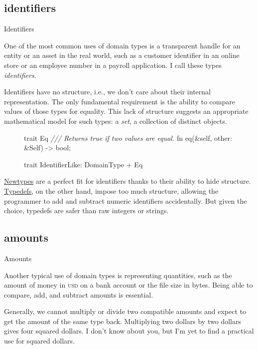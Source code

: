 \documentclass{article}
\begin{document}
\subsection{identifiers}{Identifiers}

One of the most common uses of domain types is a transparent handle for an entity or an asset in the real world, such as a customer identifier in an online store or an employee number in a payroll application.
I call these types \emph{identifiers}.

Identifiers have no structure, i.e., we don't care about their internal representation.
The only fundamental requirement is the ability to compare values of those types for equality.
This lack of structure suggests an appropriate mathematical model for such types: a \emph{set}, a collection of distinct objects.

\begin{figure}
\begin{code}
trait Eq {
  \emph{/// Returns true if two values are equal.}
  fn eq(&self, other: &Self) -> bool;
}

trait IdentifierLike: DomainType + Eq {}
\end{code}
\end{figure}

\href{#newtypes}{Newtypes} are a perfect fit for identifiers thanks to their ability to hide structure.
\href{#typdefs}{Typedefs}, on the other hand, impose too much structure, allowing the programmer to add and subtract numeric identifiers accidentally.
But given the choice, typedefs are safer than raw integers or strings.

\subsection{amounts}{Amounts}

Another typical use of domain types is representing quantities, such as the amount of money in \textsc{usd} on a bank account or the file size in bytes.
Being able to compare, add, and subtract amounts is essential.

Generally, we cannot multiply or divide two compatible amounts and expect to get the amount of the same type back.
Multiplying two dollars by two dollars gives four squared dollars.
I don't know about you, but I'm yet to find a practical use for squared dollars.
\end{document}
